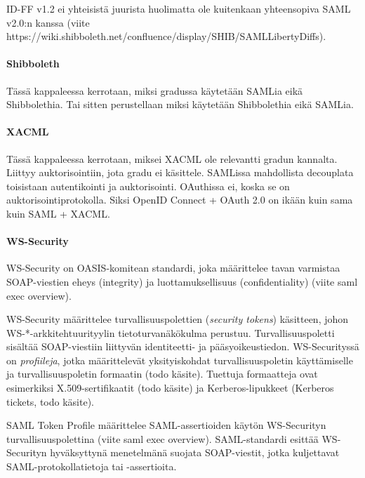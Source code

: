 \documentclass[finnish,gradu]{tktltiki}
\begin{document}
  ID-FF v1.2 ei yhteisistä juurista huolimatta ole kuitenkaan yhteensopiva SAML v2.0:n kanssa (viite https://wiki.shibboleth.net/confluence/display/SHIB/SAMLLibertyDiffs).


  \paragraph{Shibboleth} %
  \label{par:saml_vs_shibboleth}
  Tässä kappaleessa kerrotaan, miksi gradussa käytetään SAMLia eikä Shibbolethia. Tai sitten perustellaan miksi käytetään Shibbolethia eikä SAMLia.


  \paragraph{XACML} %
  \label{par:xacml}
  Tässä kappaleessa kerrotaan, miksei XACML ole relevantti gradun kannalta. Liittyy auktorisointiin, jota gradu ei käsittele. SAMLissa mahdollista decouplata toisistaan autentikointi ja auktorisointi. OAuthissa ei, koska se on auktorisointiprotokolla. Siksi OpenID Connect + OAuth 2.0 on ikään kuin sama kuin SAML + XACML.


  \paragraph{WS-Security} %
  \label{par:ws_security}
  WS-Security on OASIS-komitean standardi, joka määrittelee tavan varmistaa SOAP-viestien eheys (integrity) ja luottamuksellisuus (confidentiality) (viite saml exec overview).

  WS-Security määrittelee turvallisuuspolettien (\emph{security tokens}) käsitteen, johon WS-*-arkkitehtuurityylin tietoturvanäkökulma perustuu.
  Turvallisuuspoletti sisältää SOAP-viestiin liittyvän identiteetti- ja pääsyoikeustiedon.
  WS-Securityssä on \emph{profiileja}, jotka määrittelevät yksityiskohdat turvallisuuspoletin käyttämiselle ja turvallisuuspoletin formaatin (todo käsite).
  Tuettuja formaatteja ovat esimerkiksi X.509-sertifikaatit (todo käsite) ja Kerberos-lipukkeet (Kerberos tickets, todo käsite).

  SAML Token Profile määrittelee SAML-assertioiden käytön WS-Securityn turvallisuuspolettina (viite saml exec overview).
  SAML-standardi esittää WS-Securityn hyväksyttynä menetelmänä suojata SOAP-viestit, jotka kuljettavat SAML-protokollatietoja tai -assertioita.
\end{document}
